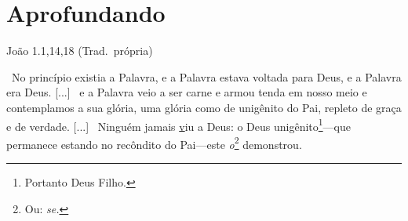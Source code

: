 \documentclass[12pt,aspectratio=169]{beamer}
\newcommand{\ver}[1]{%
    \raisebox{0.50ex}{%
        \scalebox{1.1}{%
            \pmb{\textbf{\textcolor{BSpbg}{#1}}}%
        }%
    }%
}
\newcommand{\QUOTE}[1]{%
    \par\noindent\hspace*{0.1\linewidth}%
    \begin{minipage}{0.8\linewidth}%
        \linespread{1.35}\large{#1}%
    \end{minipage}%
}
\newcommand{\YEL}[1]{{\textcolor{TXyel}{#1}}}
\newcommand{\MAG}[1]{{\textcolor{TXmag}{#1}}}
\newcommand{\BRI}[1]{{\textcolor{BSpbg}{#1}}}   %
\begin{document}
\section{Aprofundando}

    \begin{frame}{João 1.1,14,18 (Trad.~própria)}
        \QUOTE{%
            \normalsize
            \ver{1}~No    princípio    existia    \MAG{a
            Palavra}, e \MAG{a Palavra}  estava  voltada
            para \BRI{Deus}, e \MAG{a Palavra era Deus}.
            [...] \ver{14}~e \MAG{a Palavra veio  a  ser
            carne}  e  armou  tenda  em  nosso  meio   e
            contemplamos   a   sua   \YEL{glória},   uma
            \YEL{glória} como de unigênito do \BRI{Pai},
            repleto de \YEL{graça} e  de  \YEL{verdade}.
            [...]        \ver{18}~Ninguém         jamais
            \underline{v}iu a  \BRI{Deus}:  o  \MAG{Deus
            unigênito}\footnote{Portanto       \MAG{Deus
            Filho}.}---que    permanece    estando    no
            recôndito    do    \BRI{Pai}---este     {\it
            \BRI{o}}\footnote{Ou:    {\it    \BRI{se}.}}
            demonstrou.
        }
    \end{frame}

\end{document}
